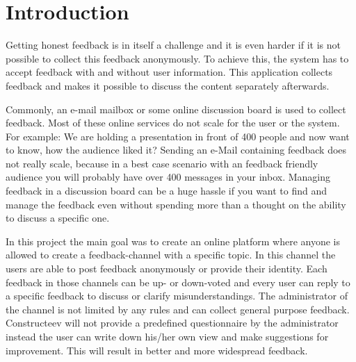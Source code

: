 
\cleardoublepage

\chapter{Introduction}

\setcounter{page}{1}

Getting honest feedback is in itself a challenge and it is even harder if it is not possible to collect this feedback  anonymously. To achieve this, the system has to accept feedback with and without user information. This application collects feedback and makes it possible to discuss the content separately afterwards.


Commonly, an e-mail mailbox or some online discussion board is used to collect feedback. Most of these online services  do not scale for the user or the system. 
For example: We are holding a presentation in front of 400 people and now want to know, how the audience liked it? Sending an e-Mail containing feedback does not really scale, because in a best case scenario with an feedback friendly audience you will probably have over 400 messages in your inbox. Managing feedback in a discussion board can be a huge hassle if you want to find and manage the feedback even without spending more than a thought on the ability to discuss a specific one.

In this project the main goal was to create an online platform where anyone is allowed to create a feedback-channel with a specific topic. In this channel the users are able to post feedback anonymously or provide their identity. Each feedback in those channels can be up- or down-voted and every user can reply to a specific feedback to discuss or clarify misunderstandings. The administrator of the channel is not limited by any rules and can collect general purpose feedback. Constructeev will not provide a predefined questionnaire by the administrator instead the user can write down his/her own view and make suggestions for improvement. This will result in better and more widespread feedback.

\cleardoublepage
